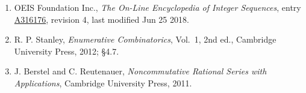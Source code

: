 \documentclass[11pt]{article}
\theoremstyle{definition}
\begin{document}
\begin{enumerate}

\item OEIS Foundation Inc., \emph{The On-Line Encyclopedia of Integer Sequences}, entry \href{https://oeis.org/A316176}{A316176}, revision 4, last modified Jun 25 2018.

\item R. P. Stanley, \emph{Enumerative Combinatorics}, Vol.~1, 2nd ed., Cambridge University Press, 2012; \S4.7.

\item J. Berstel and C. Reutenauer, \emph{Noncommutative Rational Series with Applications}, Cambridge University Press, 2011.

\end{enumerate}
\end{document}
